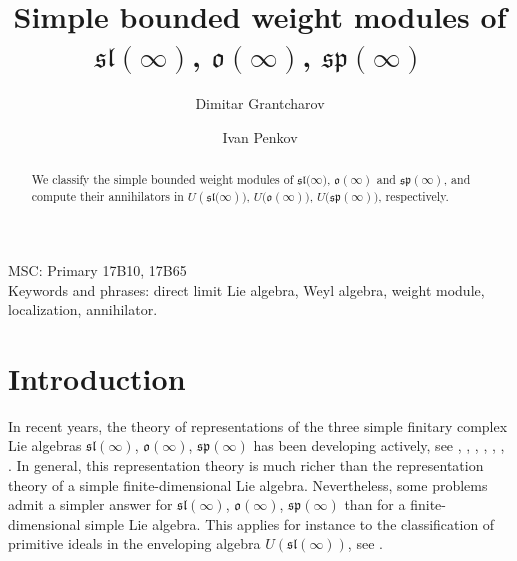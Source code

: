 \documentclass[12pt]{amsart}
\begin{document}
\title{Simple bounded weight modules of $\displaystyle{\mathfrak{sl}(\infty)}$, $\displaystyle{\mathfrak{o}(\infty)}$, $\displaystyle{\mathfrak{sp}(\infty)}$}


\author[Dimitar Grantcharov]{\;Dimitar Grantcharov}

\address{
Dimitar Grantcharov
\newline Department of Mathematics
\newline University of Texas, Arlington
\newline Arlington, TX 76019-0408
\newline  USA}





\author[Ivan Penkov]{\;Ivan Penkov}

\address{
Ivan Penkov
\newline Jacobs University Bremen
\newline Campus Ring 1
 Bremen, Germany}





\maketitle

\begin{abstract}
We classify the simple  bounded weight modules of ${\mathfrak{sl}(\infty})$, 
${\mathfrak{o}(\infty)}$ and 
${\mathfrak{sp}(\infty)}$, and compute their annihilators  in $U({\mathfrak{sl}(\infty}))$, 
$U({\mathfrak{o}(\infty))}$,
$U({\mathfrak{sp}(\infty))}$, respectively.
\end{abstract}

{\small
\medskip{} MSC: Primary 17B10, 17B65 \\
\noindent Keywords and phrases: direct limit Lie algebra, Weyl algebra, 
weight module, localization, annihilator.}

\section{Introduction}

In recent years, the theory of representations of the three simple finitary complex Lie algebras $\mathfrak{sl}(\infty)$, $\mathfrak{o}(\infty)$, $\mathfrak{sp}(\infty)$ has been developing actively, see \cite{CP}, \cite{DPS2}, \cite{HPS}, \cite{Na}, \cite{PS},  \cite{PStyr},  \cite{PZ4}. In general, this representation theory is  much richer  than the representation theory of a  simple finite-dimensional Lie algebra. Nevertheless, some problems admit a simpler answer for $\mathfrak{sl}(\infty)$, $\mathfrak{o}(\infty)$, $\mathfrak{sp}(\infty)$ than for a finite-dimensional simple Lie algebra. This applies for instance to the classification of primitive ideals in the enveloping  algebra $U(\mathfrak{sl}(\infty))$, see \cite{PP}.
\end{document}
